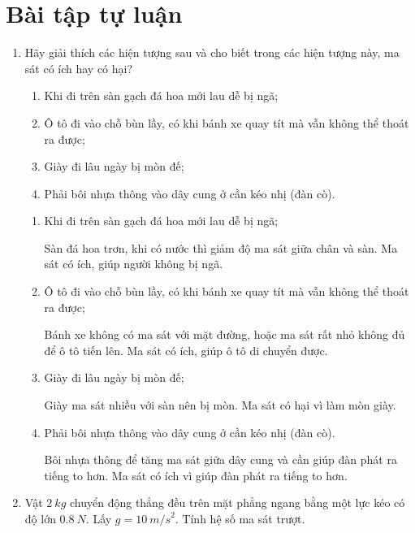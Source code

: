 \section{Bài tập tự luận}
\begin{enumerate}[label=\bfseries Bài \arabic*:,leftmargin=1.5cm]
	\item {}
	
	
	{Hãy giải thích các hiện tượng sau và cho biết trong các hiện tượng này, ma sát có ích hay có hại?
		\begin{enumerate}
			\item Khi đi trên sàn gạch đá hoa mới lau dễ bị ngã;
			\item Ô tô đi vào chỗ bùn lầy, có khi bánh xe quay tít mà vẫn không thể thoát ra được;
			\item Giày đi lâu ngày bị mòn đế;
			\item Phải bôi nhựa thông vào dây cung ở cần kéo nhị (đàn cò).
		\end{enumerate}
	}
	
	\hideall
	{
		\begin{enumerate}
			\item Khi đi trên sàn gạch đá hoa mới lau dễ bị ngã;
			
			Sàn đá hoa trơn, khi có nước thì giảm độ ma sát giữa chân và sàn. Ma sát có ích, giúp người không bị ngã.
			
			\item Ô tô đi vào chỗ bùn lầy, có khi bánh xe quay tít mà vẫn không thể thoát ra được;
			
			Bánh xe không có ma sát với mặt đường, hoặc ma sát rất nhỏ không đủ để ô tô tiến lên. Ma sát có ích, giúp ô tô di chuyển được.
			
			\item Giày đi lâu ngày bị mòn đế;
			
			Giày ma sát nhiều với sàn nên bị mòn. Ma sát có hại vì làm mòn giày.
			
			\item Phải bôi nhựa thông vào dây cung ở cần kéo nhị (đàn cò).
			
			Bôi nhựa thông để tăng ma sát giữa dây cung và cần giúp đàn phát ra tiếng to hơn. Ma sát có ích vì giúp đàn phát ra tiếng to hơn.
		\end{enumerate}
	}

	\item {}
	
	
	{Vật $\SI{2}{kg}$ chuyển động thẳng đều trên mặt phẳng ngang bằng một lực kéo có độ lớn $\SI{0,8}{N}$. Lấy $g=\SI{10}{m/s}^2$. Tính hệ số ma sát trượt.
	}
	

\end{enumerate}
